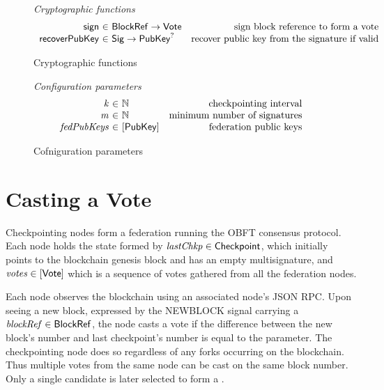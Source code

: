 \begin{figure*}[htb]
  \emph{Cryptographic functions}
  \begin{equation*}
    \begin{array}{r@{~\in~}lr}
      \fun{sign} & \BlockRef \to \Vote & \text{sign block reference to form a vote}\\
      \fun{recoverPubKey} & \Sig \to \PubKey^? & \text{recover public key from the signature if valid}
    \end{array}
  \end{equation*}
  \caption{Cryptographic functions}
  \label{fig:crypto-funs}
\end{figure*}

\begin{figure*}[htb]
  \emph{Configuration parameters}
  \begin{equation*}
    \begin{array}{r@{~\in~}lr}
      \var{k} & \N & \text{checkpointing interval}\\
      \var{m} & \N & \text{minimum number of signatures}\\
      \var{fedPubKeys} & [\PubKey] & \text{federation public keys}\\
    \end{array}
  \end{equation*}
  \caption{Cofniguration parameters}
  \label{fig:config-params}
\end{figure*}


\clearpage
\section{Casting a Vote}

Checkpointing nodes form a federation running the OBFT consensus protocol. Each node holds the state formed by $\mathit{lastChkp} \in \mathsf{Checkpoint}$, which initially points to the blockchain genesis block and has an empty multisignature, and $\mathit{votes} \in \mathsf{[Vote]}$ which is a sequence of votes gathered from all the federation nodes. 

Each node observes the blockchain using an associated node's JSON RPC. Upon seeing a new block, expressed by the NEWBLOCK signal carrying a $\mathit{blockRef} \in \mathsf{BlockRef}$, the node casts a vote if the difference between the new block's number and last checkpoint's number is equal to the  parameter. The checkpointing node does so regardless of any forks occurring on the blockchain. Thus multiple votes from the same node can be cast on the same block number. Only a single candidate is later selected to form a \Chkp.


